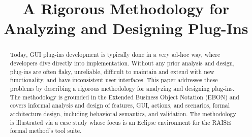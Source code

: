 \documentclass[letterpaper,conference]{IEEEtran}
\begin{document}
%
\title{A Rigorous Methodology for Analyzing and Designing Plug-Ins}


\author{

\and


\and

}



\maketitle
\thispagestyle{plain}
\pagestyle{plain}


\begin{abstract}
  Today, GUI plug-ins development is typically done in a very ad-hoc
  way, where developers dive directly into implementation.  Without
  any prior analysis and design, plug-ins are often flaky, unreliable,
  difficult to maintain and extend with new functionality, and have
  inconsistent user interfaces.  This paper addresses these problems
  by describing a rigorous methodology for analyzing and designing
  plug-ins.  The methodology is grounded in the Extended Business
  Object Notation (EBON) and covers informal analysis and design of
  features, GUI, actions, and scenarios, formal architecture design,
  including behavioral semantics, and validation.  The methodology is
  illustrated via a case study whose focus is an Eclipse environment
  for the RAISE formal method's tool suite.
\end{abstract}
\end{document}
